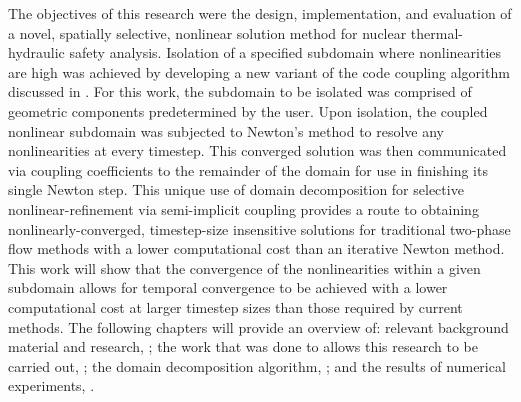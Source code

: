 The objectives of this research were the design, implementation, and evaluation of a novel, spatially selective, nonlinear solution method for nuclear thermal-hydraulic safety analysis.
Isolation of a specified subdomain where nonlinearities are high was achieved by developing a new variant of the code coupling algorithm discussed in .
For this work, the subdomain to be isolated was comprised of geometric components predetermined by the user.
Upon isolation, the coupled nonlinear subdomain was subjected to Newton's method to resolve any nonlinearities at every timestep.
This converged solution was then communicated via coupling coefficients to the remainder of the domain for use in finishing its single Newton step.
This unique use of domain decomposition for selective nonlinear-refinement via semi-implicit coupling provides a route to obtaining nonlinearly-converged, timestep-size insensitive solutions for traditional two-phase flow methods with a lower computational cost than an iterative Newton method.
This work will show that the convergence of the nonlinearities within a given subdomain allows for temporal convergence to be achieved with a lower computational cost at larger timestep sizes than those required by current methods.
The following chapters will provide an overview of: relevant background material and research, ; the work that was done to allows this research to be carried out, ; the domain decomposition algorithm, ; and the results of numerical experiments, .

